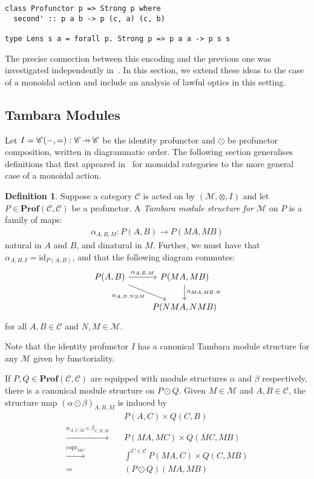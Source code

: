 \documentclass[11pt,a4paper]{article}
\theoremstyle{plain}
\theoremstyle{definition}
\newtheorem{definition}[theorem]{Definition}
\newcommand{\C}{\mathscr{C}}
\newcommand{\M}{\mathscr{M}}
\newcommand{\Prof}{\mathbf{Prof}}
\newcommand{\id}{\mathrm{id}}
\DeclareMathOperator{\copr}{copr}
\newcommand{\hto}{\ensuremath{\,\mathaccent\shortmid\rightarrow\,}}
\begin{document}
\begin{verbatim}
class Profunctor p => Strong p where
  second' :: p a b -> p (c, a) (c, b)

type Lens s a = forall p. Strong p => p a a -> p s s
\end{verbatim}

The precise connection between this encoding and the previous one was investigated independently in~\cite{ProfunctorOpticsPost}. In this section, we extend these ideas to the case of a monoidal action and include an analysis of lawful optics in this setting.

\subsection{Tambara Modules}
Let $I = \C(-,{=}) : \C \hto \C$ be the identity profunctor and $\odot$ be profunctor composition, written in diagrammatic order. The following section generalises definitions that first appeared in~\cite[Section 3]{Doubles} for monoidal categories to the more general case of a monoidal action.

\begin{definition}
  Suppose a category $\C$ is acted on by $(\M, \otimes, I)$ and let $P \in \Prof(\C, \C)$ be a profunctor. A \emph{Tambara module structure for $\M$} on $P$ is a family of maps:
  \begin{align*}
    \alpha_{A,B,M} : P(A,B) \to P(MA, MB)
  \end{align*}
  natural in $A$ and $B$, and dinatural in $M$. Further, we must have that $\alpha_{A,B,I} = \id_{P(A,B)}$, and that the following diagram commutes:
  \[
    \begin{tikzcd}
      P(A,B) \ar[r, "\alpha_{A,B,M}"] \ar[dr, "\alpha_{A, B, N \otimes M}" below left] & P(MA, MB) \ar[d, "\alpha_{MA, MB, N}" right] \\
      & P(NMA, NMB)
    \end{tikzcd}
  \]
  for all $A, B \in \C$ and $N, M \in \M$.
\end{definition}

Note that the identity profunctor $I$ has a canonical Tambara module structure for any $\M$ given by functoriality.

If $P, Q \in \Prof(\C, \C)$ are equipped with module structures $\alpha$ and $\beta$ respectively, there is a canonical module structure on $P \odot Q$. Given $M \in \M$ and $A,B \in \C$, the structure map $(\alpha \odot \beta)_{A,B,M}$ is induced by
\begin{align*}
  &P(A,C) \times Q(C,B)  \\
  \xrightarrow{\alpha_{A,C,M} \times \beta_{C,B,M}} \quad& P(MA, MC) \times Q(MC, MB) \\
  \xrightarrow{\copr_{MC}} \quad&\int^{C \in \C} P(MA, C) \times Q(C, MB) \\
  = \quad&(P \odot Q)(MA, MB)
\end{align*}
\end{document}
